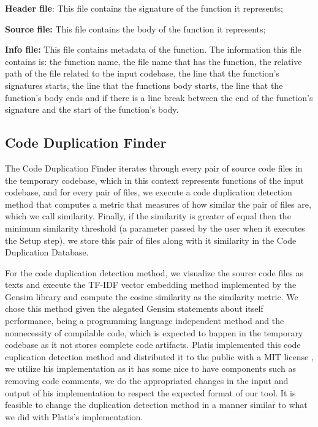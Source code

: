 \begin{itemize}
	\begin{item}
		\textbf{Header file}: This file contains the signature of the function it represents;
	\end{item}
	\begin{item}
		\textbf{Source file:} This file contains the body of the function it represents;
	\end{item}
	\begin{item}
		\textbf{Info file:} This file contains metadata of the function. The information this file contains is:
		the function name, the file name that has the function, the relative path of the file related to the input codebase, 
		the line that the function's signatures starts, the line that the functions body starts, the line that the function's body 
		ends and if there is a line break between the end of the function's signature and the start of the function's body.
		
	\end{item}
\end{itemize}

\subsection{Code Duplication Finder}

The Code Duplication Finder iterates through every pair of source code files in the temporary codebase, which in this context represents
functions of the input codebase, and for every pair of files, we execute a code duplication detection method that computes a metric
that measures of how similar the pair of files are, which we call similarity. Finally, if the similarity is greater of equal then the
minimum similarity threshold (a parameter passed by the user when it executes the Setup step), we store this pair of files along with
it similarity in the Code Duplication Database.

For the code duplication detection method, we visualize the source code files as texts and execute the TF-IDF vector embedding method
implemented by the Gensim library \citep{gensim} and compute the cosine similarity as the similarity metric. We chose this method 
given the alegated Gensim statements about itself performance, being a programming language independent method and the nonnecessity of 
compilable code, which is expected to happen in the temporary codebase as it not stores complete code artifacts. Platis implemented
this code cuplication detection method and distributed it to the public with a MIT license \citep{platistool} \citep{mitlicense}, 
we utilize his implementation as it has some nice to have components such as removing code comments, we do the appropriated changes
in the input and output of his implementation to respect the expected format of our tool. 
It is feasible to change the duplication detection method in a manner similar to what we did with Platis's implementation.

